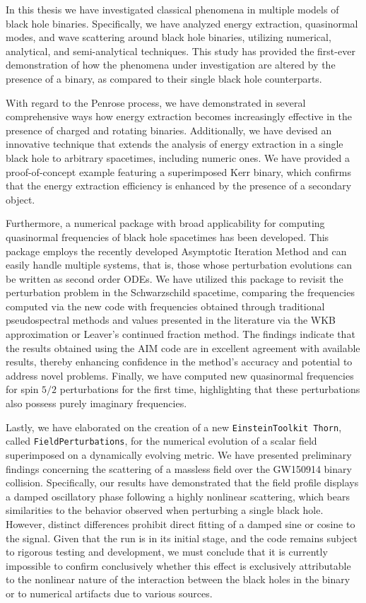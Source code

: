 In this thesis we have investigated classical phenomena in multiple models of black hole binaries. Specifically, we have analyzed energy extraction, quasinormal modes, and wave scattering around black hole binaries, utilizing numerical, analytical, and semi-analytical techniques. This study has provided the first-ever demonstration of how the phenomena under investigation are altered by the presence of a binary, as compared to their single black hole counterparts.

With regard to the Penrose process, we have demonstrated in several comprehensive ways how energy extraction becomes increasingly effective in the presence of charged and rotating binaries. Additionally, we have devised an innovative technique that extends the analysis of energy extraction in a single black hole to arbitrary spacetimes, including numeric ones. We have provided a proof-of-concept example featuring a superimposed Kerr binary, which confirms that the energy extraction efficiency is enhanced by the presence of a secondary object.

Furthermore, a numerical package with broad applicability for computing quasinormal frequencies of black hole spacetimes has been developed. This package employs the recently developed Asymptotic Iteration Method and can easily handle multiple systems, that is, those whose perturbation evolutions can be written as second order ODEs. We have utilized this package to revisit the perturbation problem in the Schwarzschild spacetime, comparing the frequencies computed via the new code with frequencies obtained through traditional pseudospectral methods and values presented in the literature via the WKB approximation or Leaver's continued fraction method. The findings indicate that the results obtained using the AIM code are in excellent agreement with available results, thereby enhancing confidence in the method's accuracy and potential to address novel problems. Finally, we have computed new quasinormal frequencies for spin $5/2$ perturbations for the first time, highlighting that these perturbations also possess purely imaginary frequencies.

Lastly, we have elaborated on the creation of a new \texttt{EinsteinToolkit Thorn}, called \texttt{FieldPerturbations}, for the numerical evolution of a scalar field superimposed on a dynamically evolving metric. We have presented preliminary findings concerning the scattering of a massless field over the GW150914 binary collision. Specifically, our results have demonstrated that the field profile displays a damped oscillatory phase following a highly nonlinear scattering, which bears similarities to the behavior observed when perturbing a single black hole. However, distinct differences prohibit direct fitting of a damped sine or cosine to the signal. Given that the run is in its initial stage, and the code remains subject to rigorous testing and development, we must conclude that it is currently impossible to confirm conclusively whether this effect is exclusively attributable to the nonlinear nature of the interaction between the black holes in the binary or to numerical artifacts due to various sources.

